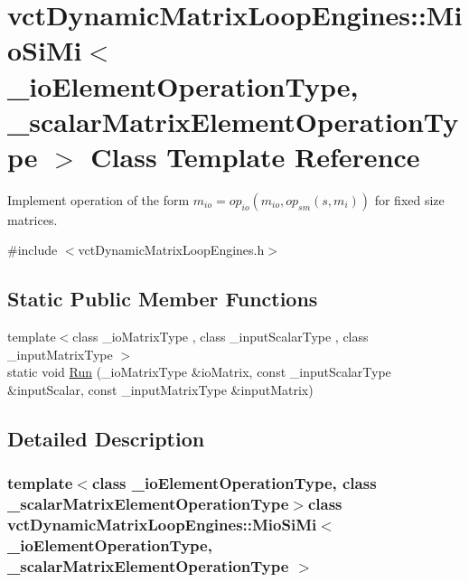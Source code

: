 \hypertarget{classvct_dynamic_matrix_loop_engines_1_1_mio_si_mi}{}\section{vct\+Dynamic\+Matrix\+Loop\+Engines\+:\+:Mio\+Si\+Mi$<$ \+\_\+io\+Element\+Operation\+Type, \+\_\+scalar\+Matrix\+Element\+Operation\+Type $>$ Class Template Reference}
\label{classvct_dynamic_matrix_loop_engines_1_1_mio_si_mi}


Implement operation of the form $m_{io} = op_{io}(m_{io}, op_{sm}(s, m_i))$ for fixed size matrices.  




{\ttfamily \#include $<$vct\+Dynamic\+Matrix\+Loop\+Engines.\+h$>$}

\subsection*{Static Public Member Functions}
\begin{DoxyCompactItemize}
\item 
{\footnotesize template$<$class \+\_\+io\+Matrix\+Type , class \+\_\+input\+Scalar\+Type , class \+\_\+input\+Matrix\+Type $>$ }\\static void \hyperlink{classvct_dynamic_matrix_loop_engines_1_1_mio_si_mi_a9dc3a8a475d2b6250f254e7236a34731}{Run} (\+\_\+io\+Matrix\+Type \&io\+Matrix, const \+\_\+input\+Scalar\+Type \&input\+Scalar, const \+\_\+input\+Matrix\+Type \&input\+Matrix)
\end{DoxyCompactItemize}


\subsection{Detailed Description}
\subsubsection*{template$<$class \+\_\+io\+Element\+Operation\+Type, class \+\_\+scalar\+Matrix\+Element\+Operation\+Type$>$class vct\+Dynamic\+Matrix\+Loop\+Engines\+::\+Mio\+Si\+Mi$<$ \+\_\+io\+Element\+Operation\+Type, \+\_\+scalar\+Matrix\+Element\+Operation\+Type $>$}

